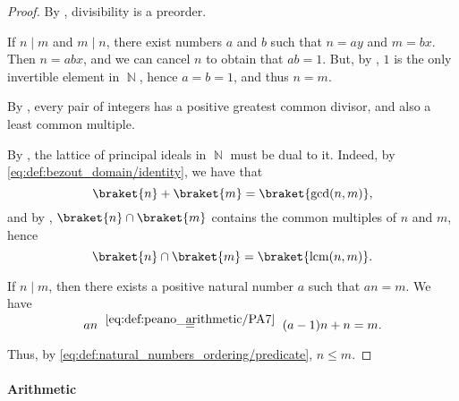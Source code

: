 \begin{proof}
  By , divisibility is a preorder.

   If \( n \mid m \) and \( m \mid n \), there exist numbers \( a \) and \( b \) such that \( n = ay \) and \( m = bx \). Then \( n = abx \), and we can cancel \( n \) to obtain that \( ab = 1 \). But, by , \( 1 \) is the only invertible element in \( \BbbN \), hence \( a = b = 1 \), and thus \( n = m \).

   By , every pair of integers has a positive greatest common divisor, and also a least common multiple.

  By , the lattice of principal ideals in \( \BbbN \) must be dual to it. Indeed, by \eqref{eq:def:bezout_domain/identity}, we have that
  \begin{equation*}
    \braket{n} + \braket{m} = \braket{ \gcd(n, m) },
  \end{equation*}
  and by , \( \braket{n} \cap \braket{m} \) contains the common multiples of \( n \) and \( m \), hence
  \begin{equation*}
    \braket{n} \cap \braket{m} = \braket{ \lcm(n, m) }.
  \end{equation*}

   If \( n \mid m \), then there exists a positive natural number \( a \) such that \( an = m \). We have
  \begin{equation*}
    an
    \reloset{\eqref{eq:def:peano_arithmetic/PA7}} =
    (a - 1)n + n
    =
    m.
  \end{equation*}

  Thus, by \eqref{eq:def:natural_numbers_ordering/predicate}, \( n \leq m \).
\end{proof}

\paragraph{Arithmetic}

